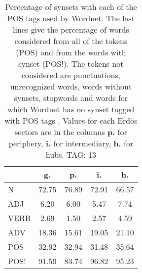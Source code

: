 \begin{table}[h!]
\begin{center}
\begin{tabular}{| l || c | c | c | c |}\hline
 & {\bf g.} & {\bf p.} & {\bf i.} & {\bf h.} \\\hline\hline
N & 72.75  & 76.89  & 72.91  & 66.57 \\\hline
ADJ & 6.20  & 6.00  & 5.47  & 7.74 \\\hline
VERB & 2.69  & 1.50  & 2.57  & 4.59 \\\hline
ADV & 18.36  & 15.61  & 19.05  & 21.10 \\\hline\hline
POS & 32.92  & 32.94  & 31.48  & 35.64 \\\hline
POS! & 91.50  & 83.74  & 96.82  & 95.23 \\\hline
\end{tabular}
\caption{Percentage of synsets with each of the POS tags used by Wordnet. The last lines give the percentage of words considered from all of the tokens (POS) and from the words with synset (POS!). The tokens not considered are punctuations, unrecognized words, words without synsets, stopwords and words for which Wordnet has no synset  tagged with POS tags . Values for each Erd\"os sectors are in the columns {{\bf p.}} for periphery, {{\bf i.}} for intermediary, {{\bf h.}} for hubs. TAG: 13}
\end{center}
\end{table}